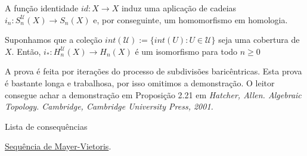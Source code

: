 A função identidade $id:X\rightarrow X$ induz uma aplicação de cadeias $i_n:S_n^{\mathcal{U}}(X)\rightarrow S_n (X)$ e, por conseguinte, um homomorfismo em homologia.


\begin{prop}
    Suponhamos que a coleção $int(\mathcal{U}):=\{int(U):U\in \mathcal{U}\}$ seja uma cobertura de $X$. Então, $i_*:H^{\mathcal{U}}_n (X)\rightarrow H_n (X)$ é um isomorfismo para todo $n\ge 0$
\end{prop}

\begin{dem}
    A prova é feita por iterações do processo de subdivisões baricêntricas. Esta prova é bastante longa e trabalhosa, por isso omitimos a demonstração. O leitor consegue achar a demonstração em Proposição 2.21 em 
    \textit{Hatcher, Allen. Algebraic Topology. Cambridge, Cambridge University Press, 2001.}
\end{dem}

\begin{titlemize}{Lista de consequências}
    \item \hyperref[sequencia-de-mayer-vietoris-prop]{Sequência de Mayer-Vietoris}.\\
\end{titlemize}
